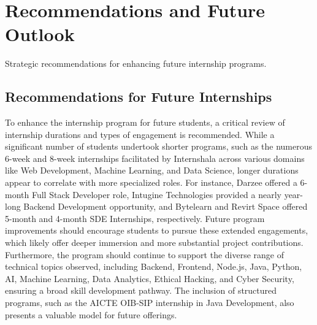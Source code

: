 \documentclass[11pt,a4paper]{article}
\newenvironment{card}{
    \begin{tcolorbox}[
        enhanced,
        colback=cardback,
        colframe=border,
        sharp corners,
        boxrule=0.5pt,
        drop shadow,
        shadow xshift=1mm,
        shadow yshift=-1mm,
        shadow color=border!50,
        boxsep=3mm,
        left=5mm, right=5mm, top=5mm, bottom=5mm,
        width=\textwidth,
        nobeforeafter
    ]
}{\end{tcolorbox}}
\begin{document}
\clearpage

\section*{\textcolor{accent}{Recommendations and Future Outlook}}
{\large\textcolor{muted}{Strategic recommendations for enhancing future internship programs.}}

\vspace{0.5cm}

\begin{card}
    \subsection*{\textcolor{accent}{Recommendations for Future Internships}}
    \vspace{0.3cm}
    To enhance the internship program for future students, a critical review of internship durations and types of engagement is recommended. While a significant number of students undertook shorter programs, such as the numerous 6-week and 8-week internships facilitated by Internshala across various domains like Web Development, Machine Learning, and Data Science, longer durations appear to correlate with more specialized roles. For instance, Darzee offered a 6-month Full Stack Developer role, Intugine Technologies provided a nearly year-long Backend Development opportunity, and Bytelearn and Revirt Space offered 5-month and 4-month SDE Internships, respectively. Future program improvements should encourage students to pursue these extended engagements, which likely offer deeper immersion and more substantial project contributions. Furthermore, the program should continue to support the diverse range of technical topics observed, including Backend, Frontend, Node.js, Java, Python, AI, Machine Learning, Data Analytics, Ethical Hacking, and Cyber Security, ensuring a broad skill development pathway. The inclusion of structured programs, such as the AICTE OIB-SIP internship in Java Development, also presents a valuable model for future offerings.


\end{card}
\end{document}
